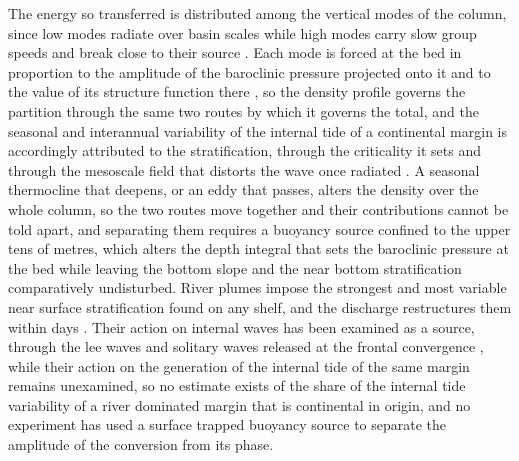 \documentclass[a4paper,fleqn]{cas-sc}
\begin{document}
The energy so transferred is distributed among the vertical modes of the column, since low modes radiate over basin scales while high modes carry slow group speeds and break close to their source \citep{kelly:2010,kelly:2012,vic2019deep}. Each mode is forced at the bed in proportion to the amplitude of the baroclinic pressure projected onto it and to the value of its structure function there \citep{llewellynsmith:2002,griffiths:2007,kelly:2012}, so the density profile governs the partition through the same two routes by which it governs the total, and the seasonal and interannual variability of the internal tide of a continental margin is accordingly attributed to the stratification, through the criticality it sets \citep{barbot_2021,tchilibou:2022,assene:2024} and through the mesoscale field that distorts the wave once radiated \citep{dunphy:2017,nelson:2019,kelly:2016,bendinger_2023,lahaye:2026}. A seasonal thermocline that deepens, or an eddy that passes, alters the density over the whole column, so the two routes move together and their contributions cannot be told apart, and separating them requires a buoyancy source confined to the upper tens of metres, which alters the depth integral that sets the baroclinic pressure at the bed while leaving the bottom slope and the near bottom stratification comparatively undisturbed. River plumes impose the strongest and most variable near surface stratification found on any shelf, and the discharge restructures them within days \citep{hornerdevine:2015,hetland:2005}. Their action on internal waves has been examined as a source, through the lee waves and solitary waves released at the frontal convergence \citep{nash:2005,stashchuk:2009}, while their action on the generation of the internal tide of the same margin remains unexamined, so no estimate exists of the share of the internal tide variability of a river dominated margin that is continental in origin, and no experiment has used a surface trapped buoyancy source to separate the amplitude of the conversion from its phase.
\end{document}
